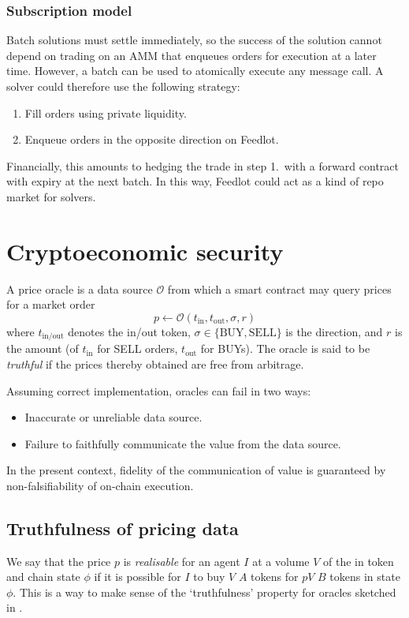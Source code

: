 \documentclass[a4paper,10pt]{article}
\theoremstyle{remark}
\newcommand \oracle {\mathcal{O}}
\begin{document}
\subsubsection{Subscription model}

Batch solutions must settle immediately, so the success of the solution cannot depend on trading on an AMM that enqueues orders for execution at a later time.
%
However, a batch can be used to atomically execute any message call.
%
A solver could therefore use the following strategy:
\begin{enumerate}
  \item Fill orders using private liquidity.
  \item Enqueue orders in the opposite direction on Feedlot.
\end{enumerate}
Financially, this amounts to hedging the trade in step 1.~with a forward contract with expiry at the next batch.
%
In this way, Feedlot could act as a kind of repo market for solvers.

\section{Cryptoeconomic security}

A price oracle is a data source $\oracle$ from which a smart contract may query prices for a market order 
\[
  p \leftarrow \oracle (t_\mathrm{in},t_\mathrm{out},\sigma,r)
\]
where $t_\mathrm{in/out}$ denotes the in/out token, $\sigma\in\{\mathrm{BUY},\mathrm{SELL}\}$ is the direction, and $r$ is the amount (of $t_\mathrm{in}$ for SELL orders, $t_\mathrm{out}$ for BUYs).
%
The oracle is said to be \emph{truthful} if the prices thereby obtained are free from arbitrage.

Assuming correct implementation, oracles can fail in two ways:
\begin{itemize}
  \item Inaccurate or unreliable data source.
  \item Failure to faithfully communicate the value from the data source.
\end{itemize}
In the present context, fidelity of the communication of value is guaranteed by non-falsifiability of on-chain execution.

\subsection{Truthfulness of pricing data}

We say that the price $p$ is \emph{realisable} for an agent $I$ at a volume $V$ of the in token and chain state $\phi$ if it is possible for $I$ to buy $V$ $A$ tokens for $pV$ $B$ tokens in state $\phi$.
%
This is a way to make sense of the `truthfulness' property for oracles sketched in \cite{heiss2019oracles}.
\end{document}
